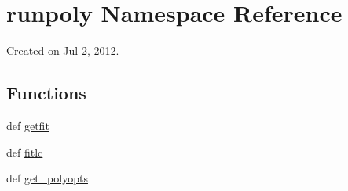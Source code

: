 \hypertarget{namespacerunpoly}{
\section{runpoly Namespace Reference}
\label{namespacerunpoly}
}


Created on Jul 2, 2012.  


\subsection*{Functions}
\begin{DoxyCompactItemize}
\item 
def \hyperlink{namespacerunpoly_aa4866b028ef0d94a7b9f237490073b28}{getfit}
\item 
def \hyperlink{namespacerunpoly_a19c006c67315b888598650bbd005e703}{fitlc}
\item 
def \hyperlink{namespacerunpoly_a8161150c40176f66e19794b6e897b284}{get\_\-polyopts}
\end{DoxyCompactItemize}
